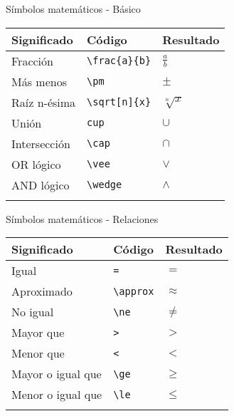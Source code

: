 \documentclass[
  ignorenonframetext,
]{beamer}
\begin{document}
\begin{frame}[fragile]{Símbolos matemáticos - Básico}
\label{suxedmbolos-matemuxe1ticos---buxe1sico-1}
\begin{longtable}[]{@{}lll@{}}
\toprule\noalign{}
Significado & Código & Resultado \\
\midrule\noalign{}
\endhead
Fracción & \texttt{\textbackslash{}frac\{a\}\{b\}} & \(\frac{a}{b}\) \\
Más menos & \texttt{\textbackslash{}pm} & \(\pm\) \\
Raíz n-ésima & \texttt{\textbackslash{}sqrt{[}n{]}\{x\}} &
\(\sqrt[n]{x}\) \\
Unión & \texttt{cup} & \(\cup\) \\
Intersección & \texttt{\textbackslash{}cap} & \(\cap\) \\
OR lógico & \texttt{\textbackslash{}vee} & \(\vee\) \\
AND lógico & \texttt{\textbackslash{}wedge} & \(\wedge\) \\
\bottomrule\noalign{}
\end{longtable}
\end{frame}

\begin{frame}[fragile]{Símbolos matemáticos - Relaciones}
\label{suxedmbolos-matemuxe1ticos---relaciones}
\begin{longtable}[]{@{}lll@{}}
\toprule\noalign{}
Significado & Código & Resultado \\
\midrule\noalign{}
\endhead
Igual & \texttt{=} & \(=\) \\
Aproximado & \texttt{\textbackslash{}approx} & \(\approx\) \\
No igual & \texttt{\textbackslash{}ne} & \(\ne\) \\
Mayor que & \texttt{\textgreater{}} & \(>\) \\
Menor que & \texttt{\textless{}} & \(<\) \\
Mayor o igual que & \texttt{\textbackslash{}ge} & \(\ge\) \\
Menor o igual que & \texttt{\textbackslash{}le} & \(\le\) \\
\bottomrule\noalign{}
\end{longtable}
\end{frame}
\end{document}
